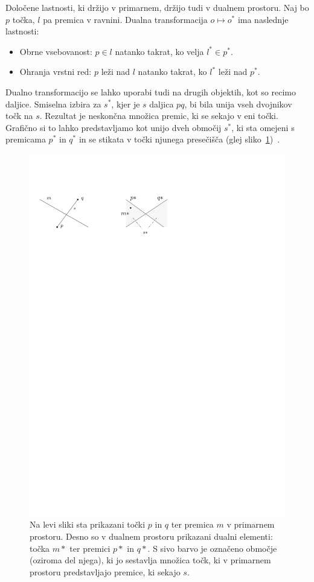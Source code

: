 \documentclass[a4paper, 12pt]{book}
\begin{document}
Določene lastnosti, ki držijo v primarnem, držijo tudi v  dualnem prostoru. Naj bo $p$ točka, $l$ pa premica v ravnini. Dualna transformacija $o \mapsto o^*$ ima naslednje lastnosti:
\begin{itemize}
\item Obrne vsebovanost: $p\in l$ natanko takrat, ko velja $l^*\in p^*$.
\item Ohranja vrstni red: $p$ leži nad $l$ natanko takrat, ko $l^*$ leži nad $p^*$.  
\end{itemize}

Dualno transformacijo se lahko uporabi tudi na drugih objektih, kot so recimo daljice. Smiselna izbira za $s^*$, kjer je $s$ daljica $pq$, bi bila unija vseh dvojnikov točk na $s$. Rezultat je neskončna množica premic, ki se sekajo v eni točki. Grafično si to lahko predstavljamo kot unijo dveh območij $s^*$, ki sta omejeni s premicama $p^*$ in $q^*$ in se stikata v točki njunega presečišča (glej sliko~\ref{dual-ex})~\cite[poglavje 8.2]{bkos-08-all}.

\begin{figure}[htp]
\centerline{\includegraphics[scale=1]{pics/dual-lines-example.pdf}}
\caption{Na levi sliki sta prikazani točki $p$ in $q$ ter premica $m$ v primarnem prostoru. Desno so v dualnem prostoru prikazani dualni elementi: točka $m*$ ter premici $p*$ in $q*$. S sivo barvo je označeno območje (oziroma del njega), ki jo sestavlja množica točk, ki v primarnem prostoru predstavljajo premice, ki sekajo $s$.} 
\label{dual-ex}
\end{figure}
\end{document}
